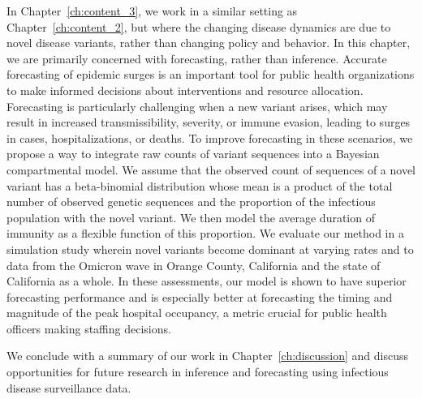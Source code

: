 In Chapter~\ref{ch:content_3}, we work in a similar setting as Chapter~\ref{ch:content_2}, but where the changing disease dynamics are due to novel disease variants, rather than changing policy and behavior.
In this chapter, we are primarily concerned with forecasting, rather than inference.
Accurate forecasting of epidemic surges is an important tool for public health organizations to make informed decisions about interventions and resource allocation.
Forecasting is particularly challenging when a new variant arises, which may result in increased transmissibility, severity, or immune evasion, leading to surges in cases, hospitalizations, or deaths.
To improve forecasting in these scenarios, we propose a way to integrate raw counts of variant sequences into a Bayesian compartmental model.
We assume that the observed count of sequences of a novel variant has a beta-binomial distribution whose mean is a product of the total number of observed genetic sequences and the proportion of the infectious population with the novel variant.
We then model the average duration of immunity as a flexible function of this proportion.
We evaluate our method in a simulation study wherein novel variants become dominant at varying rates and to data from the Omicron wave in Orange County, California and the state of California as a whole.
In these assessments, our model is shown to have superior forecasting performance and is especially better at forecasting the timing and magnitude of the peak hospital occupancy, a metric crucial for public health officers making staffing decisions.

We conclude with a summary of our work in Chapter~\ref{ch:discussion} and discuss opportunities for future research in inference and forecasting using infectious disease surveillance data.

\label{ch_1:sec:thesis_contributions}




